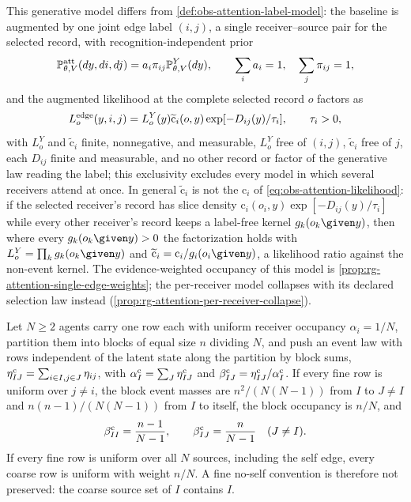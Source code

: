 This generative model differs from \cref{def:obs-attention-label-model}: the
baseline is augmented by one joint edge label \((i,j)\), a single
receiver--source pair for the selected record, with recognition-independent
prior
\begin{equation}
\mathbb P_{\theta,V}^{\rm att}(dy,di,dj)=a_i\pi_{ij}\mathbb P_{\theta,V}^Y(dy),
\qquad
\sum_i a_i=1,
\quad
\sum_j\pi_{ij}=1,
\label{eq:rg-attention-fixed-label-joint}
\end{equation}
and the augmented likelihood at the complete selected record \(o\) factors as
\begin{equation}
L_o^{\rm edge}(y,i,j)
=L_o^Y(y)\widetilde{\mathrm c}_i(o,y)\exp[-D_{ij}(y)/\tau_i],
\qquad\tau_i>0,
\label{eq:rg-attention-single-edge-likelihood}
\end{equation}
with \(L_o^Y\) and \(\widetilde{\mathrm c}_i\) finite, nonnegative, and
measurable, \(L_o^Y\) free of \((i,j)\), \(\widetilde{\mathrm c}_i\) free of
\(j\), each \(D_{ij}\) finite and measurable, and no other record or factor of
the generative law reading the label; this exclusivity excludes every model in
which several receivers attend at once. In general \(\widetilde{\mathrm c}_i\)
is not the \(\mathrm c_i\) of \eqref{eq:obs-attention-likelihood}: if the
selected receiver's record has slice density
\(\mathrm c_i(o_i,y)\exp[-D_{ij}(y)/\tau_i]\) while every other receiver's
record keeps a label-free kernel \(g_k(o_k\given y)\), then where every
\(g_k(o_k\given y)>0\) the factorization holds with
\(L_o^Y=\prod_kg_k(o_k\given y)\) and
\(\widetilde{\mathrm c}_i=\mathrm c_i/g_i(o_i\given y)\), a likelihood ratio
against the non-event kernel. The evidence-weighted occupancy of this model is
\cref{prop:rg-attention-single-edge-weights}; the per-receiver model collapses
with its declared selection law instead
(\cref{prop:rg-attention-per-receiver-collapse}).

Let \(N\ge2\) agents carry one row each with uniform receiver occupancy
\(\alpha_i=1/N\), partition them into blocks of equal size \(n\) dividing
\(N\), and push an event law with rows independent of the latent state along
the partition by block sums, \(\eta^{\rm c}_{IJ}=\sum_{i\in I,j\in J}\eta_{ij}\),
with \(\alpha^{\rm c}_I=\sum_J\eta^{\rm c}_{IJ}\) and
\(\beta^{\rm c}_{IJ}=\eta^{\rm c}_{IJ}/\alpha^{\rm c}_I\). If every fine row is
uniform over \(j\ne i\), the block event masses are \(n^2/(N(N-1))\) from \(I\)
to \(J\ne I\) and \(n(n-1)/(N(N-1))\) from \(I\) to itself, the block occupancy
is \(n/N\), and
\begin{equation}
\beta^{\rm c}_{II}=\frac{n-1}{N-1},
\qquad
\beta^{\rm c}_{IJ}=\frac{n}{N-1}\quad(J\ne I).
\label{eq:obs-attention-self-edge-coarse-rows}
\end{equation}
If every fine row is uniform over all \(N\) sources, including the self edge,
every coarse row is uniform with weight \(n/N\). A fine no-self convention is
therefore not preserved: the coarse source set of \(I\) contains \(I\).

